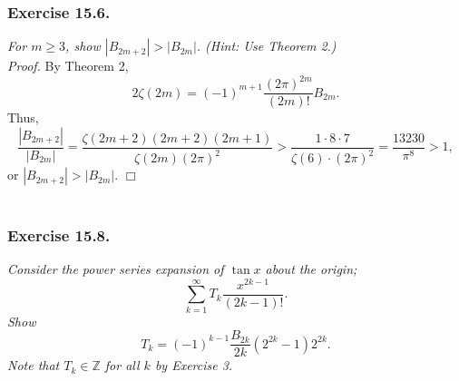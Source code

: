 \documentclass{article}
\begin{document}



\subsubsection*{Exercise 15.6.}
\emph{For $m \geq 3$, show $|B_{2m+2}| > |B_{2m}|$. (Hint: Use Theorem 2.)} \\

\emph{Proof.}
By Theorem 2,
$$2 \zeta(2m) = (-1)^{m+1} \frac{(2\pi)^{2m}}{(2m)!} B_{2m}.$$
Thus,
$$\frac{|B_{2m+2}|}{|B_{2m}|}
= \frac{\zeta(2m+2)(2m+2)(2m+1)}{\zeta(2m)(2\pi)^2}
> \frac{1 \cdot 8 \cdot 7}{\zeta(6) \cdot (2\pi)^2}
= \frac{13230}{\pi^8}
> 1,$$
or $|B_{2m+2}| > |B_{2m}|$.
$\Box$ \\\\






\subsubsection*{Exercise 15.8.}
\emph{Consider the power series expansion of $\tan x$ about the origin;
$$\sum_{k=1}^{\infty} T_k \frac{x^{2k - 1}}{(2k - 1)!}.$$
Show $$T_k = (-1)^{k-1} \frac{B_{2k}}{2k} (2^{2k} - 1) 2^{2k}.$$
Note that $T_k \in \mathbb{Z}$ for all $k$ by Exercise 3.} \\
\end{document}
